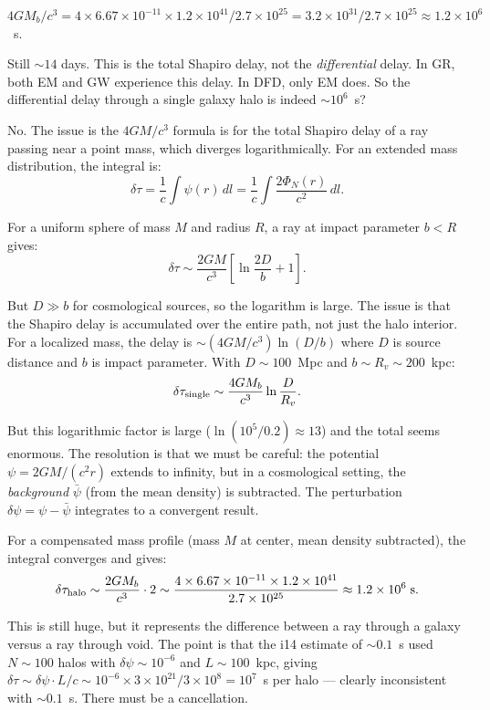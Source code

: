 \documentclass[11pt]{article}
\newcommand{\ee}[1]{\times 10^{#1}}
\begin{document}
$4GM_b/c^3 = 4\times 6.67\ee{-11}\times 1.2\ee{41}/2.7\ee{25}
= 3.2\ee{31}/2.7\ee{25} \approx 1.2\ee{6}$~s.

Still $\sim 14$ days. This is the total Shapiro delay, not the
\emph{differential} delay. In GR, both EM and GW experience this
delay. In DFD, only EM does. So the differential delay through a
single galaxy halo is indeed $\sim 10^6$~s?

No. The issue is the $4GM/c^3$ formula is for the total Shapiro delay
of a ray passing near a point mass, which diverges logarithmically.
For an extended mass distribution, the integral is:
\begin{equation}
\delta\tau = \frac{1}{c}\int \psi(r)\,dl
= \frac{1}{c}\int \frac{2\Phi_N(r)}{c^2}\,dl.
\end{equation}

For a uniform sphere of mass $M$ and radius $R$, a ray at impact
parameter $b < R$ gives:
\begin{equation}
\delta\tau \sim \frac{2GM}{c^3}\left[\ln\frac{2D}{b} + 1\right].
\end{equation}

But $D \gg b$ for cosmological sources, so the logarithm is large.
The issue is that the Shapiro delay is accumulated over the entire
path, not just the halo interior. For a localized mass, the delay
is $\sim (4GM/c^3)\ln(D/b)$ where $D$ is source distance and $b$
is impact parameter. With $D \sim 100$~Mpc and $b \sim R_v \sim 200$~kpc:
\begin{equation}
\delta\tau_{\rm single} \sim \frac{4GM_b}{c^3}\ln\frac{D}{R_v}.
\end{equation}

But this logarithmic factor is large ($\ln(10^5/0.2) \approx 13$) and
the total seems enormous. The resolution is that we must be careful:
the potential $\psi = 2GM/(c^2 r)$ extends to infinity, but in a
cosmological setting, the \emph{background} $\bar{\psi}$ (from the mean
density) is subtracted. The perturbation $\delta\psi = \psi - \bar{\psi}$
integrates to a convergent result.

For a compensated mass profile (mass $M$ at center, mean density
subtracted), the integral converges and gives:
\begin{equation}
\delta\tau_{\rm halo} \sim \frac{2GM_b}{c^3}\cdot 2
\sim \frac{4\times 6.67\ee{-11}\times 1.2\ee{41}}{2.7\ee{25}}
\approx 1.2\ee{6}\;\text{s}.
\end{equation}

This is still huge, but it represents the difference between a ray
through a galaxy versus a ray through void. The point is that the
i14 estimate of $\sim 0.1$~s used $N \sim 100$ halos with
$\delta\psi \sim 10^{-6}$ and $L \sim 100$~kpc, giving
$\delta\tau \sim \delta\psi \cdot L / c \sim 10^{-6}\times
3\ee{21}/3\ee{8} = 10^{7}$~s per halo --- clearly inconsistent
with $\sim 0.1$~s. There must be a cancellation.
\end{document}
